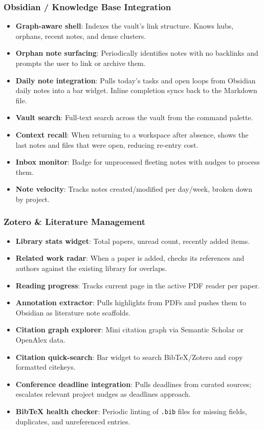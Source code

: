\documentclass[11pt,a4paper]{article}
\begin{document}
\subsubsection{Obsidian / Knowledge Base Integration}
\label{sec:features-obsidian}
\begin{itemize}[leftmargin=1.5em, itemsep=2pt]
  \item \textbf{Graph-aware shell}: Indexes the vault's link structure. Knows hubs, orphans, recent notes, and dense clusters.
  \item \textbf{Orphan note surfacing}: Periodically identifies notes with no backlinks and prompts the user to link or archive them.
  \item \textbf{Daily note integration}: Pulls today's tasks and open loops from Obsidian daily notes into a bar widget. Inline completion syncs back to the Markdown file.
  \item \textbf{Vault search}: Full-text search across the vault from the command palette.
  \item \textbf{Context recall}: When returning to a workspace after absence, shows the last notes and files that were open, reducing re-entry cost.
  \item \textbf{Inbox monitor}: Badge for unprocessed fleeting notes with nudges to process them.
  \item \textbf{Note velocity}: Tracks notes created/modified per day/week, broken down by project.
\end{itemize}

\subsubsection{Zotero \& Literature Management}
\label{sec:features-zotero}
\begin{itemize}[leftmargin=1.5em, itemsep=2pt]
  \item \textbf{Library stats widget}: Total papers, unread count, recently added items.
  \item \textbf{Related work radar}: When a paper is added, checks its references and authors against the existing library for overlaps.
  \item \textbf{Reading progress}: Tracks current page in the active PDF reader per paper.
  \item \textbf{Annotation extractor}: Pulls highlights from PDFs and pushes them to Obsidian as literature note scaffolds.
  \item \textbf{Citation graph explorer}: Mini citation graph via Semantic Scholar or OpenAlex data.
  \item \textbf{Citation quick-search}: Bar widget to search BibTeX/Zotero and copy formatted citekeys.
  \item \textbf{Conference deadline integration}: Pulls deadlines from curated sources; escalates relevant project nudges as deadlines approach.
  \item \textbf{BibTeX health checker}: Periodic linting of \texttt{.bib} files for missing fields, duplicates, and unreferenced entries.
\end{itemize}
\end{document}
